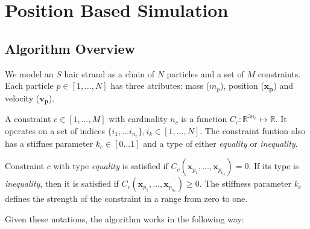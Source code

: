 \documentclass[sigplan,screen,nonacm]{acmart}
\begin{document}
\section{Position Based Simulation}

\subsection{Algorithm Overview}
\label{section:algorithmOverview}
We model an $S$ hair strand as a chain of $N$ particles and a set of $M$
constraints. Each particle $p \in [1,\ldots,N]$ has three atributes: mass ($m_p$), position
($\boldsymbol{x_p}$) and velocity ($\boldsymbol{v_p}$). 

A constraint $c \in [1,\ldots,M]$ with cardinality $n_c$ is a function $C_c
: \mathbb{R} ^{3n_c} \mapsto \mathbb{R}$. It operates on a set of indices $\{i_1,\ldots
i_{n_c}\}, i_k \in [1,...,N]$. The constraint funtion also has a stiffnes
parameter $k_c \in [0...1]$ and a type of either \emph{equality} or
\emph{inequality}.

Constraint $c$ with type \emph{equality} is satisfied if
$C_c(\boldsymbol{x}_{p_1},\ldots, \boldsymbol{x}_{p_{n_j}})=0$. If its type is
\emph{inequality}, then it is satisfied if $C_c(\boldsymbol{x}_{p_1}, \ldots,
\boldsymbol{x}_{p_{n_c}}) \geq 0$. The stiffness parameter $k_c$ defines the
strength of the constraint in a range from zero to one.

Given these notations, the algorithm works in the following way:
\end{document}
